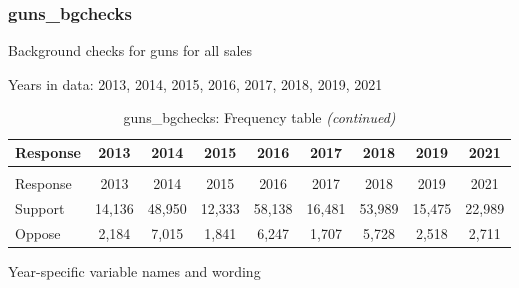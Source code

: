 \documentclass[
  12pt]{article}
\begin{document}
\hypertarget{guns_bgchecks}{%
\subsubsection{guns\_bgchecks}\label{guns_bgchecks}}

Background checks for guns for all sales

Years in data: 2013, 2014, 2015, 2016, 2017, 2018, 2019,
2021\begingroup\fontsize{10}{12}\selectfont

\begin{longtable}[t]{lcccccccc}
\caption{\label{tab:unnamed-chunk-5}guns\_bgchecks: Frequency table}\\
\toprule
Response & 2013 & 2014 & 2015 & 2016 & 2017 & 2018 & 2019 & 2021\\
\midrule
\endfirsthead
\caption[]{guns\_bgchecks: Frequency table \textit{(continued)}}\\
\toprule
Response & 2013 & 2014 & 2015 & 2016 & 2017 & 2018 & 2019 & 2021\\
\midrule
\endhead

\endfoot
\bottomrule
\endlastfoot
Support & 14,136 & 48,950 & 12,333 & 58,138 & 16,481 & 53,989 & 15,475 & 22,989\\
Oppose & 2,184 & 7,015 & 1,841 & 6,247 & 1,707 & 5,728 & 2,518 & 2,711\\*
\end{longtable}
\endgroup{}

Year-specific variable names and
wording\begingroup\fontsize{11}{13}\selectfont
\end{document}
